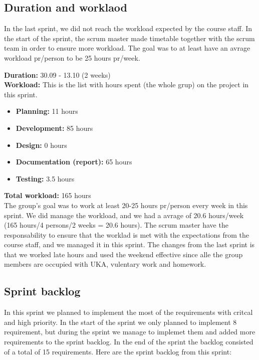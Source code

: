 \subsection{Duration and worklaod}
	In the last sprint, we did not reach the workload expected by the course staff.
	In the start of the sprint, the scrum master made timetable together with the
	scrum team in order to ensure more workload. The goal was to at least have an
	avrage workload pr/person to be 25 hours pr/week. 

	{\bf Duration:} 30.09 - 13.10 (2 weeks)\\
	{\bf Workload:} This is the list with hours spent (the whole grup) on the project in this sprint.
	\begin{itemize}
		\item {\bf Planning:} 11 hours
		\item {\bf Development:} 85 hours
		\item {\bf Design:} 0 hours
		\item {\bf Documentation (report):} 65 hours
		\item {\bf Testing:} 3.5 hours
	\end{itemize}
	{\bf Total workload: } 165 hours \\

	The group's goal was to work at least 20-25 hours pr/person every week in this sprint. 
	We did manage the workload, and we had a avrage of 20.6 hours/week (165 hours/4 persons/2 weeks = 20.6 hours). 
	The scrum master have the responsability to ensure that the worklad is met with the
	expectations from the course staff, and we managed it in this sprint.
	The changes from the last sprint is that we worked late hours and used the weekend effective
	since alle the group members are occupied with UKA, vulentary work and homework.

\subsection{Sprint backlog}

	In this sprint we planned to implement the most of the requirements with critcal and high
	priority. In the start of the sprint we only planned to implement 8 requirement, but
	during the sprint we manage to implemet them and added more requirements to the sprint backlog.
	In the end of the sprint the backlog consisted of a total of 15 requirements. Here are the
	sprint backlog from this sprint:

